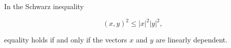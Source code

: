 In the Schwarz inequality

$$(x, y)^2 \leq |x|^2 |y|^2,$$

equality holds if and only if the vectors $x$ and $y$ are linearly dependent.

